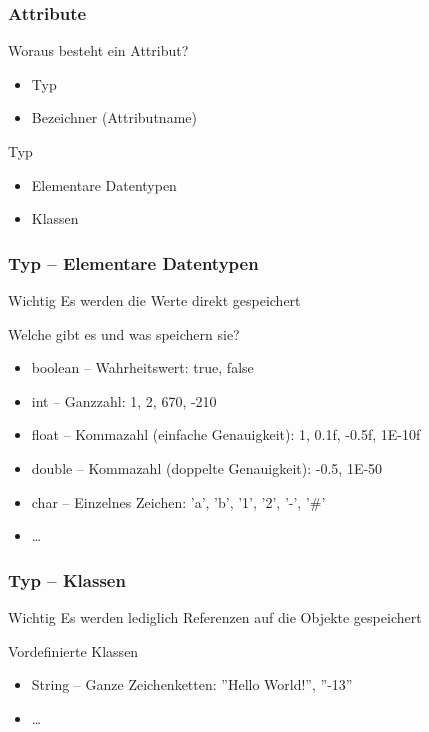 \documentclass{beamer}
\begin{document}
\begin{frame}
\frametitle{Attribute}
\begin{block}{Woraus besteht ein Attribut?}
\pause
\begin{itemize}
\item Typ
\item Bezeichner (Attributname)
\end{itemize}
\end{block}

\pause

\begin{block}{Typ}
\begin{itemize}
\item Elementare Datentypen
\item Klassen
\end{itemize}
\end{block}
\end{frame}


\begin{frame}
\frametitle{Typ -- Elementare Datentypen}
\begin{block}{Wichtig}
Es werden die Werte direkt gespeichert
\end{block}

\pause

\begin{block}{Welche gibt es und was speichern sie?}
\pause
\begin{itemize}
\item boolean -- \pause Wahrheitswert: true, false\pause\\
\item int -- \pause Ganzzahl: 1, 2, 670, -210\pause\\
\item float -- \pause Kommazahl (einfache Genauigkeit): 1, 0.1f, -0.5f, 1E-10f\pause\\
\item double -- \pause Kommazahl (doppelte Genauigkeit): -0.5, 1E-50\pause\\
\item char -- \pause Einzelnes Zeichen: 'a', 'b', '1', '2', '-', '\#'\\
\item \dots
\end{itemize}
\end{block}
\end{frame}


\begin{frame}
\frametitle{Typ -- Klassen}
\begin{block}{Wichtig}
Es werden lediglich Referenzen auf die Objekte gespeichert
\end{block}

\pause

\begin{block}{Vordefinierte Klassen}
\begin{itemize}
\item String -- \pause Ganze Zeichenketten: ''Hello World!'', ''-13''\\
\item \dots
\end{itemize}
\end{block}
\end{frame}
\end{document}
